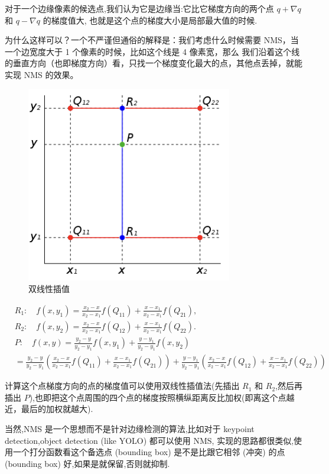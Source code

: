 对于一个边缘像素的候选点,我们认为它是边缘当:它比它梯度方向的两个点 $q+\nabla q$ 和 $q-\nabla q$ 的梯度值大,
也就是这个点的梯度大小是局部最大值的时候.

为什么这样可以？一个不严谨但通俗的解释是：我们考虑什么时候需要 NMS，当一个边宽度大于 1 个像素的时候，比如这个线是 4 像素宽，那么
我们沿着这个线的垂直方向（也即梯度方向）看，只找一个梯度变化最大的点，其他点丢掉，就能实现 NMS 的效果。

\begin{figure}[htbp]
    \centering
	\includegraphics[scale=0.4]{figures/bilinear.png}
	\caption{双线性插值}
\end{figure}

\[
\begin{aligned}
    &R_{1}{:}\quad f(x,y_{1})=\frac{x_{2}-x}{x_{2}-x_{1}}f(Q_{11})+\frac{x-x_{1}}{x_{2}-x_{1}}f(Q_{21}),\\
    &R_{2}{:}\quad f(x,y_{2})=\frac{x_{2}-x}{x_{2}-x_{1}}f(Q_{12})+\frac{x-x_{1}}{x_{2}-x_{1}}f(Q_{22}).\\
    &P{:}\quad f(x,y)=\frac{y_{2}-y}{y_{2}-y_{1}}f(x,y_{1})+\frac{y-y_{1}}{y_{2}-y_{1}}f(x,y_{2})\\&=\frac{y_{2}-y}{y_{2}-y_{1}}\left(\frac{x_{2}-x}{x_{2}-x_{1}}f(Q_{11})+\frac{x-x_{1}}{x_{2}-x_{1}}f(Q_{21})\right)+\frac{y-y_{1}}{y_{2}-y_{1}}\left(\frac{x_{2}-x}{x_{2}-x_{1}}f(Q_{12})+\frac{x-x_{1}}{x_{2}-x_{1}}f(Q_{22})\right)
\end{aligned}
\]

计算这个点梯度方向的点的梯度值可以使用双线性插值法(先插出 $R_1$ 和 $R_2$,然后再插出 $P$),也即把这个点周围的四个点的梯度按照横纵距离反比加权(即离这个点越近，最后的加权就越大).

当然,NMS 是一个思想而不是针对边缘检测的算法,比如对于 keypoint detection,object detection (like YOLO) 都可以使用 NMS,
实现的思路都很类似,使用一个打分函数看这个备选点 (bounding box) 是不是比跟它相邻 (冲突) 的点 (bounding box) 好,如果是就保留,否则就抑制.

